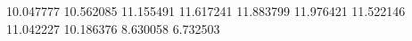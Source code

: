 10.047777
10.562085
11.155491
11.617241
11.883799
11.976421
11.522146
11.042227
10.186376
8.630058
6.732503
